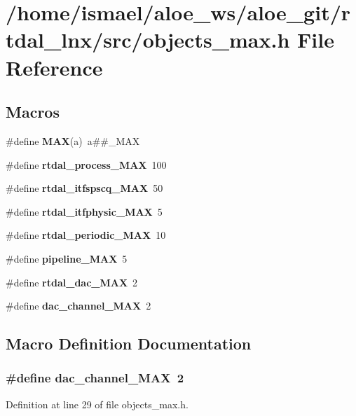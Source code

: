 \section{/home/ismael/aloe\-\_\-ws/aloe\-\_\-git/rtdal\-\_\-lnx/src/objects\-\_\-max.h File Reference}
\label{objects__max_8h}
\subsection*{Macros}
\begin{DoxyCompactItemize}
\item 
\#define {\bf M\-A\-X}(a)~a\#\#\-\_\-\-M\-A\-X
\item 
\#define {\bf rtdal\-\_\-process\-\_\-\-M\-A\-X}~100
\item 
\#define {\bf rtdal\-\_\-itfspscq\-\_\-\-M\-A\-X}~50
\item 
\#define {\bf rtdal\-\_\-itfphysic\-\_\-\-M\-A\-X}~5
\item 
\#define {\bf rtdal\-\_\-periodic\-\_\-\-M\-A\-X}~10
\item 
\#define {\bf pipeline\-\_\-\-M\-A\-X}~5
\item 
\#define {\bf rtdal\-\_\-dac\-\_\-\-M\-A\-X}~2
\item 
\#define {\bf dac\-\_\-channel\-\_\-\-M\-A\-X}~2
\end{DoxyCompactItemize}


\subsection{Macro Definition Documentation}
\subsubsection[{dac\-\_\-channel\-\_\-\-M\-A\-X}]{\setlength{\rightskip}{0pt plus 5cm}\#define dac\-\_\-channel\-\_\-\-M\-A\-X~2}\label{objects__max_8h_ae9b48a0b4843b5769436ab181c47fff2}


Definition at line 29 of file objects\-\_\-max.\-h.

